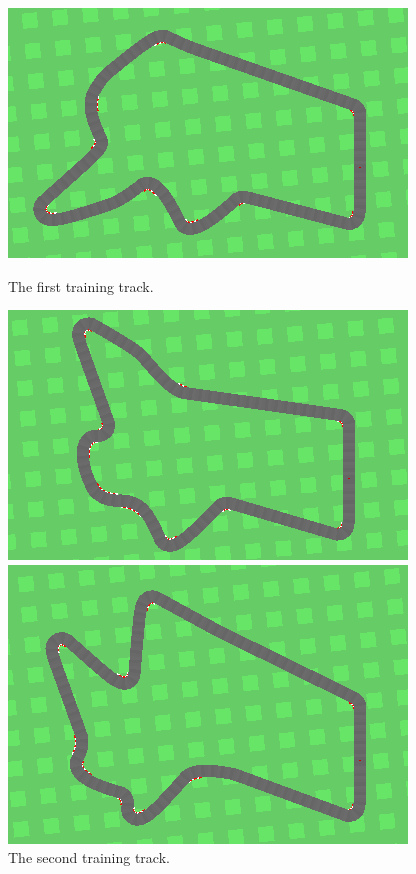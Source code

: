 \documentclass{article}
\begin{document}
\begin{figure}[!h]
\captionsetup{justification=centering}
\centering
\begin{minipage}[t]{.3\textwidth}
  \centering
  \includegraphics[width=\linewidth]{Graphics/track104.png}
  \caption{The first training track.}
  \label{fig:curves_comparison}
\end{minipage}
\begin{minipage}[t]{.3\textwidth}
  \centering
  \includegraphics[width=\linewidth]{Graphics/track106.png}
  \caption{The second training track.}
  \label{fig:curves}
\end{minipage}
\begin{minipage}[t]{.3\textwidth}
  \centering
  \includegraphics[width=\linewidth]{Graphics/track108.png}

\end{minipage}
\end{figure}
\end{document}
